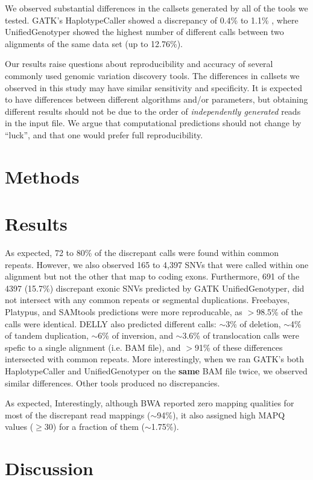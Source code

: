 \documentclass[10pt,a4paper]{article}
\begin{document}
We observed substantial differences in the callsets generated by all of the tools we tested. GATK's HaplotypeCaller showed a discrepancy of 0.4\% to 1.1\% , where UnifiedGenotyper showed the highest number of different calls between two alignments of the same data set (up to 12.76\%). 


Our results raise questions about reproducibility and accuracy of several commonly used genomic variation discovery tools. 
The differences in callsets we observed in this study 
may have similar sensitivity and specificity. It is expected to
have differences between different algorithms and/or parameters, but
obtaining different results should not be due to the order of {\it independently generated} reads in the input file. 
We argue that computational predictions should not change by ``luck'', and that 
one would prefer full reproducibility. 






\section{Methods}
\section{Results}

As expected, 72 to 80\% of the discrepant calls were found within common repeats. However, we also observed 165 to 4,397 SNVs 
that were called within one alignment but not the other that map to coding exons. 
Furthermore, 691 of the 4397 (15.7\%) discrepant exonic SNVs predicted by GATK UnifiedGenotyper,  did not intersect with any common repeats or segmental duplications.
Freebayes, Platypus, and SAMtools predictions were more reproducable, as $>$98.5\% of the calls were identical.
DELLY also predicted different calls: $\sim$3\% of deletion, $\sim$4\% of tandem duplication, $\sim$6\% of inversion, and $\sim$3.6\% of translocation calls were spefic to a single alignment (i.e. BAM file), and $>$91\% of
these differences intersected with common repeats. More interestingly, when we ran GATK's both HaplotypeCaller and UnifiedGenotyper on the {\bf same} BAM file twice, we observed similar differences. Other tools produced no discrepancies.

As expected, 
Interestingly, although BWA reported zero mapping qualities for 
most of the discrepant read mappings ($\sim$94\%), it also assigned high MAPQ values ($\geq$30) for a fraction of them ($\sim$1.75\%). 


\section{Discussion}

\small



\end{document}
